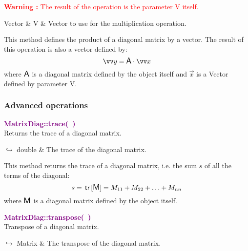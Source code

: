 \hspace*{10mm}\textcolor{red}{\textbf{Warning :}  The result of the operation is the parameter V itself.}

\begin{tcolorbox}[width=\textwidth,myArgs,tabularx={ll|R}]
Vector & V & Vector to use for the multiplication operation.
\end{tcolorbox}

This method defines the product of a diagonal matrix by a vector.
The result of this operation is also a vector defined by:
\begin{equation*}
\overrightarrow{y} = \A \cdot \overrightarrow{x}
\end{equation*}
where $\mbox{\large\ensuremath{\mathsf{A}}}$ is a diagonal matrix defined by the object itself and $\overrightarrow{x}$ is a Vector defined by parameter V.

\subsubsection{Advanced operations}

\textcolor{purple}{\textbf{MatrixDiag::trace(~)}}\label{MatrixDiag::trace()}\\
Returns the trace of a diagonal matrix.\vspace*{-0.5em}
\begin{tcolorbox}[grow to left by=-1cm, width=\textwidth-1cm,myArgs,tabularx={l|R}]
$\hookrightarrow$ double & The trace of the diagonal matrix.
\end{tcolorbox}

This method returns the trace of a diagonal matrix, i.e. the sum $s$ of all the terms of the diagonal:
\begin{equation*}
s = \mbox{\ensuremath{\mathsf{\,tr\,}}}[\mbox{\large\ensuremath{\mathsf{M}}}] = M_{11}+M_{22}+\hdots+M_{nn}
\end{equation*}
where $\mbox{\large\ensuremath{\mathsf{M}}}$ is a diagonal matrix defined by the object itself.

\textcolor{purple}{\textbf{MatrixDiag::transpose(~)}}\label{MatrixDiag::transpose()}\\
Transpose of a diagonal matrix.\vspace*{-0.5em}
\begin{tcolorbox}[grow to left by=-1cm, width=\textwidth-1cm,myArgs,tabularx={l|R}]
$\hookrightarrow$ Matrix & The transpose of the diagonal matrix.
\end{tcolorbox}

